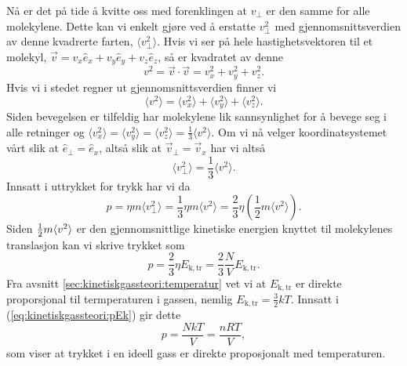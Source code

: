 Nå er det på tide å kvitte oss med forenklingen at $v_\perp$ er den samme for alle molekylene. Dette kan vi enkelt gjøre ved å erstatte $v_\perp^2$ med gjennomsnittsverdien av denne kvadrerte farten, $\langle v_\perp^2\rangle$. Hvis vi ser på hele hastighetsvektoren til et molekyl, $\vec{v} = v_x \hat{e}_x +  v_y \hat{e}_y +  v_z \hat{e}_z$, så er kvadratet av denne
\begin{displaymath}
	v^2 = \vec{v}\cdot\vec{v} = v_x^2 + v_y^2+v_z^2.
\end{displaymath}
Hvis vi i stedet regner ut gjennomsnittsverdien finner vi
\begin{displaymath}
	\langle v^2\rangle =\langle v_x^2\rangle +\langle v_y^2\rangle + \langle v_z^2\rangle.
\end{displaymath}
Siden bevegelsen er tilfeldig har molekylene lik sannsynlighet for å bevege seg i alle retninger og $\langle v_x^2\rangle = \langle v_y^2\rangle = \langle v_z^2\rangle = \frac{1}{3}\langle v^2\rangle$. Om vi nå velger koordinatsystemet vårt slik at $\hat{e}_\perp = \hat{e}_x$, altså slik at $\vec{v}_\perp = \vec{v}_x$ har vi altså
\begin{displaymath}
	\langle v_\perp^2 \rangle =\frac{1}{3}\langle v^2 \rangle.
\end{displaymath}
Innsatt i uttrykket for trykk har vi da
\begin{displaymath}
	p = \eta m\langle v_\perp^2 \rangle = \frac{1}{3}\eta m\langle v^2 \rangle = \frac{2}{3}\eta \left(\frac{1}{2}m\langle v^2 \rangle\right).
\end{displaymath}
Siden $\frac{1}{2} m\langle v^2\rangle$ er den gjennomsnittlige kinetiske energien knyttet til molekylenes translasjon kan vi skrive trykket som
\begin{equation}
\label{eq:kinetiskgassteori:pEk}
	p = \frac{2}{3}\eta E_\mathrm{k,tr} = \frac{2}{3}\frac{N}{V}E_\mathrm{k,tr}.
\end{equation}
Fra avsnitt \ref{sec:kinetiskgassteori:temperatur} vet vi at $E_\mathrm{k,tr}$ er direkte proporsjonal til termperaturen i gassen, nemlig $E_\mathrm{k,tr} = \frac{3}{2}kT$. Innsatt i (\ref{eq:kinetiskgassteori:pEk}) gir dette
\begin{equation}
\label{eq:kinetiskgassteori:eos}
	p = \frac{NkT}{V} = \frac{nRT}{V},
\end{equation}
som viser at trykket i en ideell gass er direkte proposjonalt med temperaturen.


